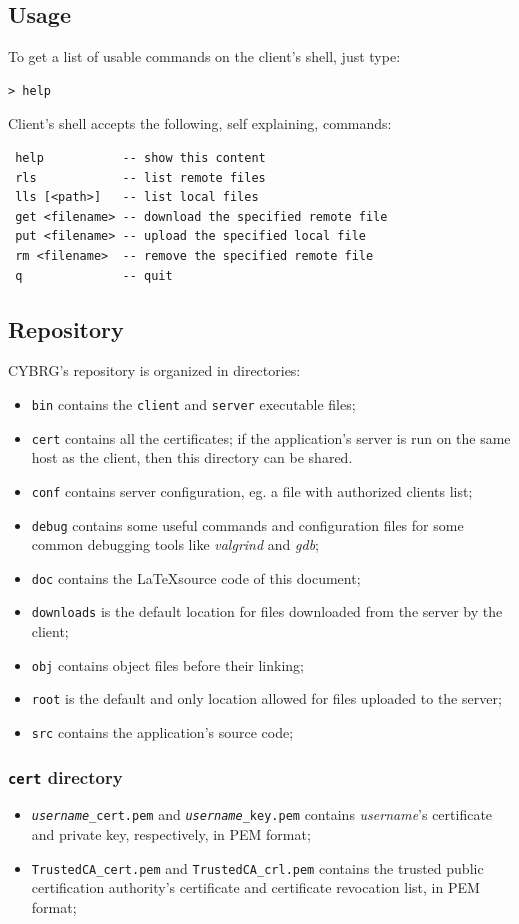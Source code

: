 \documentclass[a4paper,12pt]{article}
\newcommand{\projectname}{CYBRG}
\begin{document}
\subsection{Usage}
To get a list of usable commands on the client's shell, just type:
\begin{verbatim}
> help
\end{verbatim}

Client's shell accepts the following, self explaining, commands:
\begin{verbatim}
 help           -- show this content
 rls            -- list remote files
 lls [<path>]   -- list local files
 get <filename> -- download the specified remote file
 put <filename> -- upload the specified local file
 rm <filename>  -- remove the specified remote file
 q              -- quit
\end{verbatim}

\subsection{Repository}
\projectname{}'s repository is organized in directories:
\begin{itemize}
  \item \texttt{bin} contains the \texttt{client} and \texttt{server} executable files;
  \item \texttt{cert} contains all the certificates; if the application's server is run on the same host as the client, then this directory can be shared.
  \item \texttt{conf} contains server configuration, eg. a file with authorized clients list;
  \item \texttt{debug} contains some useful commands and configuration files for some common debugging tools like \emph{valgrind} and \emph{gdb};
  \item \texttt{doc} contains the \LaTeX source code of this document;
  \item \texttt{downloads} is the default location for files downloaded from the server by the client;
  \item \texttt{obj} contains object files before their linking;
  \item \texttt{root} is the default and only location allowed for files uploaded to the server;
  \item \texttt{src} contains the application's source code;
\end{itemize}

\subsubsection{\texttt{cert} directory}
\begin{itemize}
    \item \texttt{\emph{username}\_cert.pem} and \texttt{\emph{username}\_key.pem} contains \emph{username}'s certificate and private key, respectively, in PEM format;
    \item \texttt{TrustedCA\_cert.pem} and \texttt{TrustedCA\_crl.pem} contains the trusted public certification authority's certificate and certificate revocation list, in PEM format;
\end{itemize}
\end{document}
